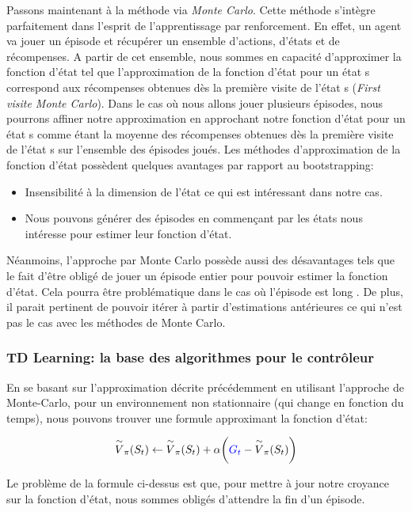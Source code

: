Passons maintenant à la méthode via \emph{Monte Carlo}. Cette méthode s'intègre parfaitement dans l'esprit de l'apprentissage par renforcement. En effet, un agent va jouer un épisode et récupérer un ensemble d'actions, d'états et de récompenses. A partir de cet ensemble, nous sommes en capacité d'approximer la fonction d'état tel que l'approximation de la fonction d'état pour un état s correspond aux récompenses obtenues dès la première visite de l'état s (\emph{First visite Monte Carlo}\cite{sutton98a}). Dans le cas où nous allons jouer plusieurs épisodes, nous pourrons affiner notre approximation en approchant notre fonction d'état pour un état s comme étant la moyenne des récompenses obtenues dès la première visite de l'état s sur l'ensemble des épisodes joués.
Les méthodes d'approximation de la fonction d'état possèdent quelques avantages par rapport au bootstrapping:

\begin{itemize}
    \item Insensibilité à la dimension de l'état ce qui est intéressant dans notre cas.
    \item Nous pouvons générer des épisodes en commençant par les états nous intéresse pour estimer leur fonction d'état.
\end{itemize}

Néanmoins, l'approche par Monte Carlo possède aussi des désavantages tels que le fait d'être obligé de jouer un épisode entier pour pouvoir estimer la fonction d'état. Cela pourra être problématique dans le cas où l'épisode est  long . De plus, il parait pertinent de pouvoir itérer à partir d'estimations antérieures ce qui n'est pas le cas avec les méthodes de Monte Carlo.

\subsubsection{TD Learning: la base des algorithmes pour le contrôleur}
En se basant sur l'approximation décrite précédemment en utilisant l'approche de Monte-Carlo, pour un environnement non stationnaire (qui change en fonction du temps), nous pouvons trouver une formule approximant la fonction d'état:
 
 \begin{equation}
\overset{\sim}{V}_{\pi}(S_t) \leftarrow \overset{\sim}{V}_{\pi}(S_t) + \alpha \bigg(\textcolor{blue}{G_t} - \overset{\sim}{V}_{\pi}(S_t)\bigg)
\end{equation}
 
Le problème de la formule ci-dessus est que, pour mettre à jour notre croyance sur la fonction d'état, nous sommes obligés d'attendre la fin d'un épisode.

